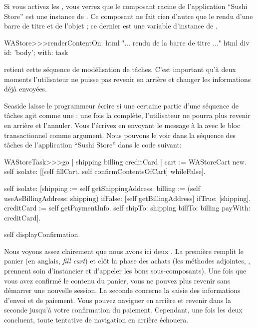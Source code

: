 \documentclass[a4paper,10pt,twoside]{book}
\begin{document}
Si vous activez les , vous verrez que le
composant racine de l'application ``Sushi Store'' est une instance de
.
Ce composant ne fait rien d'autre que le rendu d'une barre de titre et
de l'objet ; ce dernier est une variable d'instance de
.

\begin{code}{}
WAStore>>>renderContentOn: html
	"... rendu de la barre de titre ..."
	html div id: 'body'; with: task
\end{code}

 retient cette séquence de modélisation de tâches.
C'est important qu'à deux moments l'utilisateur ne puisse pas revenir
en arrière et changer les informations déjà envoyées.


Seaside laisse le programmeur écrire si une certaine partie d'une
séquence de tâches agit comme une \transaction: une fois la
\transaction complète, l'utilisateur ne pourra plus revenir en arrière
et l'annuler.
Vous l'écrivez en envoyant le message  à
la \task avec le bloc transactionnel comme argument.
Nous pouvons le voir dans la séquence des tâches de l'application
``Sushi Store'' dans le code suivant:

\begin{code}{}
WAStoreTask>>>go
	| shipping billing creditCard |
	cart := WAStoreCart new.
	self isolate:
		[[self fillCart.
		self confirmContentsOfCart]
			whileFalse].

	self isolate:
		[shipping := self getShippingAddress.
		billing := (self useAsBillingAddress: shipping)
					ifFalse: [self getBillingAddress]
					ifTrue: [shipping].
		creditCard := self getPaymentInfo.
		self shipTo: shipping billTo: billing payWith: creditCard].

	self displayConfirmation.
\end{code}

Nous voyons assez clairement que nous avons ici deux \transactions.
La première remplit le panier (en anglais, \emph{fill cart}) et clôt
la phase des achats (les méthodes adjointes,  \etc,
prennent soin d'instancier et d'appeler les bons sous-composants).
Une fois que vous avez confirmé le contenu du panier, vous ne pouvez
plus revenir sans démarrer une nouvelle session.
La seconde \transaction concerne la saisie des informations d'envoi et
de paiement.
Vous pouvez naviguer en arrière et revenir dans la seconde
\transaction{} jusqu'à votre confirmation du paiement.
Cependant, une fois les deux \transactions{} concluent, toute tentative
de navigation en arrière échouera.
\end{document}
